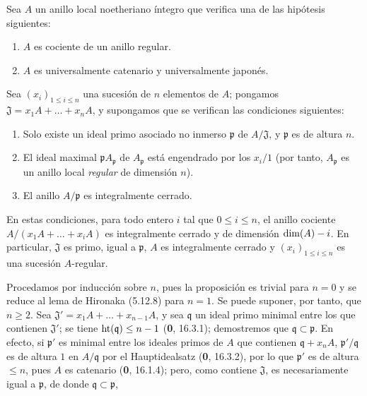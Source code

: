 \begin{corollary}[5.12.10]
\label{IV.2.s5.12.10-fr}
Sea $A$ un anillo local noetheriano íntegro que verifica una de las hipótesis
siguientes:
\begin{enumerate}
\item[\textup{a)}] $A$ es cociente de un anillo regular.
\item[\textup{b)}] $A$ es universalmente catenario y universalmente japonés.
\end{enumerate}
Sea $(x_i)_{1\leq i\leq n}$ una sucesión de $n$ elementos de $A$; pongamos
$\mathfrak J=x_1A+\ldots+x_nA$, y supongamos que se verifican las condiciones
siguientes:
\begin{enumerate}
\item[\textup{(i)}] Solo existe un ideal primo asociado no inmerso $\mathfrak p$ de
$A/\mathfrak J$, y $\mathfrak p$ es de altura $n$.
\item[\textup{(ii)}] El ideal maximal $\mathfrak pA_{\mathfrak p}$ de
$A_{\mathfrak p}$ está engendrado por los $x_i/1$ \textup{(por tanto,
$A_{\mathfrak p}$ es un anillo local \emph{regular} de dimensión $n$)}.
\item[\textup{(iii)}] El anillo $A/\mathfrak p$ es integralmente cerrado.
\end{enumerate}
En estas condiciones, para todo entero $i$ tal que $0\leq i\leq n$, el anillo
cociente $A/(x_1A+\ldots+x_iA)$ es integralmente cerrado y de dimensión
$\dim(A)- i$. En particular, $\mathfrak J$ es primo, igual a $\mathfrak p$,
$A$ es integralmente cerrado y $(x_i)_{1\leq i\leq n}$ es una sucesión
$A$-regular.
\end{corollary}

Procedamos por inducción sobre $n$, pues la proposición es trivial para $n=0$
y se reduce al lema de Hironaka (5.12.8) para $n=1$. Se puede suponer, por
tanto, que $n\geq2$. Sea $\mathfrak J'=x_1A+\ldots+x_{n-1}A$, y sea
$\mathfrak q$ un ideal primo minimal entre los que contienen $\mathfrak J'$;
se tiene $\operatorname{ht}(\mathfrak q)\leq n- 1$ (\textbf 0, 16.3.1); demostremos que
$\mathfrak q\subset\mathfrak p$. En efecto, si $\mathfrak p'$ es minimal
entre los ideales primos de $A$ que contienen $\mathfrak q+x_nA$,
$\mathfrak p'/\mathfrak q$ es de altura $1$ en $A/\mathfrak q$ por el
Hauptidealsatz (\textbf 0, 16.3.2), por lo que $\mathfrak p'$ es de altura $\leq n$,
pues $A$ es catenario (\textbf 0, 16.1.4); pero, como contiene $\mathfrak J$, es
necesariamente igual a $\mathfrak p$, de donde
$\mathfrak q\subset\mathfrak p$,

